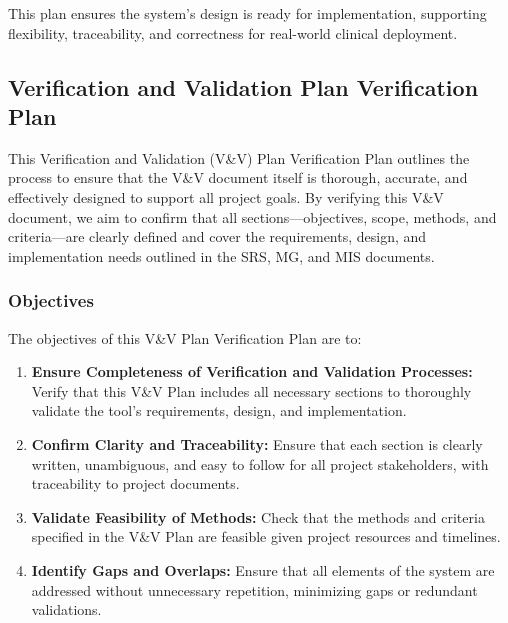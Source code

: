 \documentclass[12pt, titlepage]{article}
\begin{document}
This plan ensures the system's design is ready for implementation, supporting flexibility, traceability, and correctness for real-world clinical deployment.

\subsection{Verification and Validation Plan Verification Plan}


This Verification and Validation (V\&V) Plan Verification Plan outlines the process to ensure that the V\&V document itself is thorough, accurate, and effectively designed to support all project goals. By verifying this V\&V document, we aim to confirm that all sections---objectives, scope, methods, and criteria---are clearly defined and cover the requirements, design, and implementation needs outlined in the SRS, MG, and MIS documents.

\subsubsection{Objectives}
The objectives of this V\&V Plan Verification Plan are to:
\begin{enumerate}
  \item \textbf{Ensure Completeness of Verification and Validation Processes:} Verify that this V\&V Plan includes all necessary sections to thoroughly validate the tool's requirements, design, and implementation.
  \item \textbf{Confirm Clarity and Traceability:} Ensure that each section is clearly written, unambiguous, and easy to follow for all project stakeholders, with traceability to project documents.
  \item \textbf{Validate Feasibility of Methods:} Check that the methods and criteria specified in the V\&V Plan are feasible given project resources and timelines.
  \item \textbf{Identify Gaps and Overlaps:} Ensure that all elements of the system are addressed without unnecessary repetition, minimizing gaps or redundant validations.
\end{enumerate}
\end{document}
